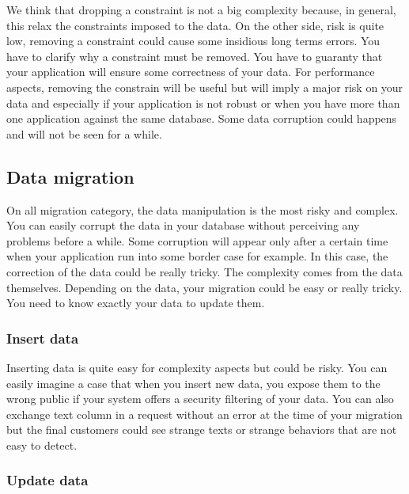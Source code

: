 We think that dropping a constraint is not a big complexity because, in general, this relax the constraints imposed to the data. On the other side, risk is quite low, removing a constraint could cause some insidious long terms errors. You have to clarify why a constraint must be removed. You have to guaranty that your application will ensure some correctness of your data. For performance aspects, removing the constrain will be useful but will imply a major risk on your data and especially if your application is not robust or when you have more than one application against the same database. Some data corruption could happens and will not be seen for a while.

\subsection{Data migration}

On all migration category, the data manipulation is the most risky and complex. You can easily corrupt the data in your database without perceiving any problems before a while. Some corruption will appear only after a certain time when your application run into some border case for example. In this case, the correction of the data could be really tricky. The complexity comes from the data themselves. Depending on the data, your migration could be easy or really tricky. You need to know exactly your data to update them.

\subsubsection{Insert data\\}

Inserting data is quite easy for complexity aspects but could be risky. You can easily imagine a case that when you insert new data, you expose them to the wrong public if your system offers a security filtering of your data. You can also exchange text column in a request without an error at the time of your migration but the final customers could see strange texts or strange behaviors that are not easy to detect.

\subsubsection{Update data\\}

